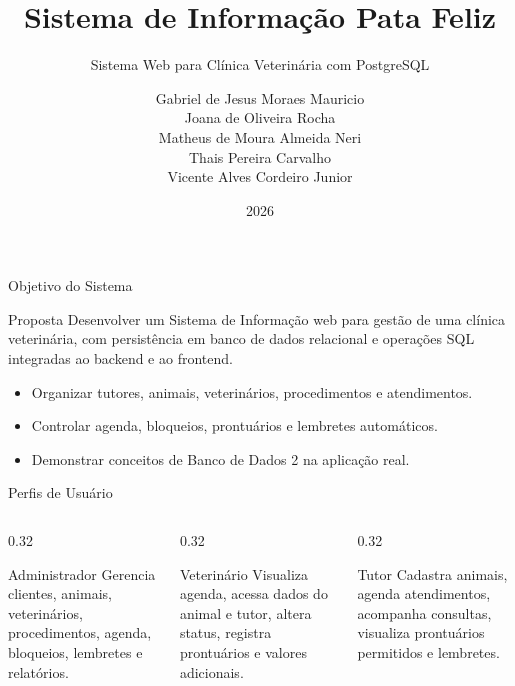 \documentclass[aspectratio=169,11pt]{beamer}
\title[Sistema Pata Feliz]{Sistema de Informação Pata Feliz}
\subtitle{Sistema Web para Clínica Veterinária com PostgreSQL}
\author[Gabriel, Joana, Matheus, Thais e Vicente]{
  Gabriel de Jesus Moraes Mauricio\\
  Joana de Oliveira Rocha\\
  Matheus de Moura Almeida Neri\\
  Thais Pereira Carvalho\\
  Vicente Alves Cordeiro Junior
}
\institute{
  Banco de Dados 2\\
  Professor: Áthila Rocha Trindade
}
\date{2026}
\begin{document}
\begin{frame}
  \titlepage
\end{frame}

\begin{frame}{Objetivo do Sistema}
  \begin{block}{Proposta}
    Desenvolver um Sistema de Informação web para gestão de uma clínica veterinária, com persistência em banco de dados relacional e operações SQL integradas ao backend e ao frontend.
  \end{block}

  \begin{itemize}
    \item Organizar tutores, animais, veterinários, procedimentos e atendimentos.
    \item Controlar agenda, bloqueios, prontuários e lembretes automáticos.
    \item Demonstrar conceitos de Banco de Dados 2 na aplicação real.
  \end{itemize}
\end{frame}

\begin{frame}{Perfis de Usuário}
  \begin{columns}[T]
    \begin{column}{0.32\textwidth}
      \begin{block}{Administrador}
        Gerencia clientes, animais, veterinários, procedimentos, agenda, bloqueios, lembretes e relatórios.
      \end{block}
    \end{column}
    \begin{column}{0.32\textwidth}
      \begin{block}{Veterinário}
        Visualiza agenda, acessa dados do animal e tutor, altera status, registra prontuários e valores adicionais.
      \end{block}
    \end{column}
    \begin{column}{0.32\textwidth}
      \begin{block}{Tutor}
        Cadastra animais, agenda atendimentos, acompanha consultas, visualiza prontuários permitidos e lembretes.
      \end{block}
    \end{column}
  \end{columns}
\end{frame}
\end{document}

